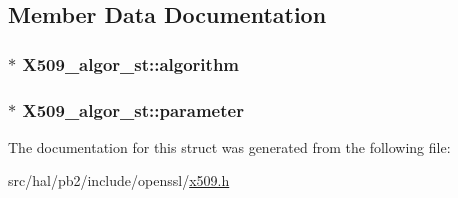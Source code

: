 \subsection{Member Data Documentation}
\subsubsection[{\texorpdfstring{algorithm}{algorithm}}]{$\ast$ X509\+\_\+algor\+\_\+st\+::algorithm}\hypertarget{struct_x509__algor__st_a79eaee9147e50e87d311ccd20f781960}{}\label{struct_x509__algor__st_a79eaee9147e50e87d311ccd20f781960}
\subsubsection[{\texorpdfstring{parameter}{parameter}}]{$\ast$ X509\+\_\+algor\+\_\+st\+::parameter}\hypertarget{struct_x509__algor__st_a0c0f294d859665c5b1e6d86c695ac4e1}{}\label{struct_x509__algor__st_a0c0f294d859665c5b1e6d86c695ac4e1}


The documentation for this struct was generated from the following file\+:\begin{DoxyCompactItemize}
\item 
src/hal/pb2/include/openssl/\hyperlink{x509_8h}{x509.\+h}\end{DoxyCompactItemize}
